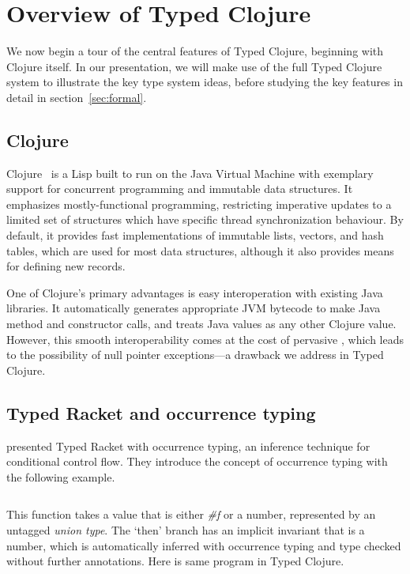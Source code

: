 \section{Overview of Typed Clojure}

\label{sec:overview}

We now begin a tour of the central features of Typed Clojure,
beginning with Clojure itself. In our presentation, we will make 
use of the full Typed Clojure system to illustrate the key type system
ideas, before studying the key features in detail in
section~\ref{sec:formal}. 

\subsection{Clojure}

Clojure~\cite{Hic08} is a Lisp built to run on the
Java Virtual Machine with exemplary support for concurrent programming
and immutable data structures. It emphasizes mostly-functional
programming, restricting imperative updates to a limited set of
structures which have specific thread synchronization behaviour. By
default, it provides fast implementations of immutable lists, vectors,
and hash tables, which are used for most data structures, although it
also provides means for defining new records.

One of Clojure's primary advantages is easy interoperation with
existing Java libraries. It automatically generates appropriate JVM
bytecode to make Java method and constructor calls, and treats Java
values as any other Clojure value. However, this smooth
interoperability comes at the cost of pervasive , which
leads to the possibility of null pointer exceptions---a drawback we
address in Typed Clojure.

\subsection{Typed Racket and occurrence typing}

\citet{TF10}
presented Typed Racket with occurrence typing,
an inference technique for conditional control flow.
They introduce the concept of occurrence typing 
with the following example.

\inputminted[firstline=1]{racket}{code/tr/example1.rkt}

This function takes a value that is either \emph{\#f} %
or a number, represented by an untagged \emph{union type}.
The `then' branch has an implicit invariant
that  is a number, which is automatically inferred with occurrence typing
and type checked without further annotations.
Here is same program in Typed Clojure.

